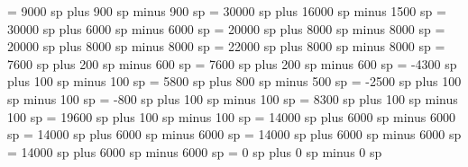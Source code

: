\grespaceaftersigns= 9000 sp plus 900 sp minus 900 sp
\grespaceafterlineclef = 30000 sp plus 16000 sp minus 1500 sp 
\greinterwordspacenotes = 30000 sp plus 6000 sp minus 6000 sp
\greinterwordspacenotestext = 20000 sp plus 8000 sp minus 8000 sp
\greinterwordspacetextnotes = 20000 sp plus 8000 sp minus 8000 sp
\greinterwordspacetext = 22000 sp plus 8000 sp minus 8000 sp
\grebitrivirspace = 7600 sp plus 200 sp minus 600 sp
\grebitristrospace = 7600 sp plus 200 sp minus 600 sp
\grepunctuminclinatumshift= -4300 sp plus 100 sp minus 100 sp
\grebeforepunctainclinatashift= 5800 sp plus 800 sp minus 500 sp
\grepunctuminclinatumanddebilisshift= -2500 sp plus 100 sp minus 100 sp
\grepunctuminclinatumdebilisshift= -800 sp plus 100 sp minus 100 sp
\grepunctuminclinatumbigshift= 8300 sp plus 100 sp minus 100 sp
\grepunctuminclinatummaxshift= 19600 sp plus 100 sp minus 100 sp
\grespacearoundsmallbar = 14000 sp plus 6000 sp minus 6000 sp
\grespacearoundminor = 14000 sp plus 6000 sp minus 6000 sp
\grespacearoundmaior = 14000 sp plus 6000 sp minus 6000 sp
\grespacearoundfinalis = 14000 sp plus 6000 sp minus 6000 sp
\grespacebeforefinalfinalis= 0 sp plus 0 sp minus 0 sp
